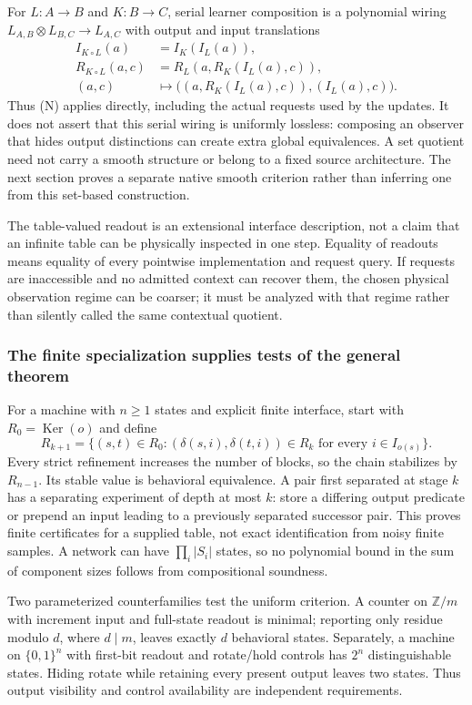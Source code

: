 \documentclass[11pt]{article}
\theoremstyle{definition}
\theoremstyle{remark}\newtheorem{remark}[theorem]{Remark}
\newcommand{\Ker}{\operatorname{Ker}}
\begin{document}
For $L:A\to B$ and $K:B\to C$, serial learner composition is a polynomial
wiring
$L_{A,B}\otimes L_{B,C}\to L_{A,C}$ with output and input translations
\begin{align*}
 I_{K\circ L}(a)&=I_K(I_L(a)),\\
 R_{K\circ L}(a,c)&=R_L(a,R_K(I_L(a),c)),\\
 (a,c)&\longmapsto
 \bigl((a,R_K(I_L(a),c)),(I_L(a),c)\bigr).
\end{align*}
Thus (N) applies directly, including the actual requests used by the
updates. It does not assert that this serial wiring is uniformly lossless:
composing an observer that hides output distinctions can create extra
global equivalences. A set quotient need not carry a smooth structure or belong to a fixed
source architecture. The next section proves a separate native smooth
criterion rather than inferring one from this set-based construction.


The table-valued readout is an extensional interface description, not a claim
that an infinite table can be physically inspected in one step. Equality of
readouts means equality of every pointwise implementation and request query.
If requests are inaccessible and no admitted context can recover them, the
chosen physical observation regime can be coarser; it must be analyzed with
that regime rather than silently called the same contextual quotient.

\subsubsection{The finite specialization supplies tests of the general theorem}
For a machine with $n\geq1$ states and explicit finite interface, start with
$R_0=\Ker(o)$ and define
\[
 R_{k+1}=\{(s,t)\in R_0:
   (\delta(s,i),\delta(t,i))\in R_k\text{ for every }i\in I_{o(s)}\}.
\]
Every strict refinement increases the number of blocks, so the chain
stabilizes by $R_{n-1}$. Its stable value is behavioral equivalence.
A pair first separated at stage $k$ has a separating experiment of depth
at most $k$: store a differing output predicate or prepend an input leading
to a previously separated successor pair. This proves finite certificates
for a supplied table, not exact identification from noisy finite samples.
A network can have $\prod_i|S_i|$ states, so no polynomial bound in the sum
of component sizes follows from compositional soundness.

Two parameterized counterfamilies test the uniform criterion. A counter on
$\mathbb Z/m$ with increment input and full-state readout is minimal;
reporting only residue modulo $d$, where $d\mid m$, leaves exactly $d$
behavioral states. Separately, a machine on $\{0,1\}^n$ with first-bit
readout and rotate/hold controls has $2^n$ distinguishable states. Hiding
rotate while retaining every present output leaves two states. Thus output
visibility and control availability are independent requirements.
\end{document}
